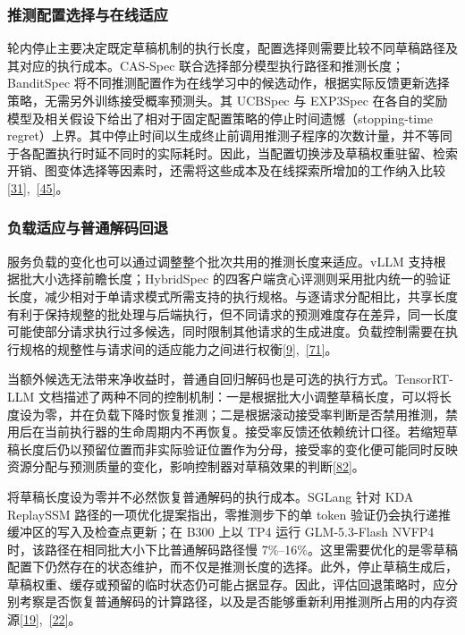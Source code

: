 \documentclass[11pt,a4paper,UTF8,fontset=none,scheme=plain,zihao=-4]{ctexart}
\begin{document}
\hypertarget{section-6-1-2}{%
\subsubsection{推测配置选择与在线适应}\label{section-6-1-2}}

轮内停止主要决定既定草稿机制的执行长度，配置选择则需要比较不同草稿路径及其对应的执行成本。CAS-Spec
联合选择部分模型执行路径和推测长度；BanditSpec
将不同推测配置作为在线学习中的候选动作，根据实际反馈更新选择策略，无需另外训练接受概率预测头。其
UCBSpec 与 EXP3Spec
在各自的奖励模型及相关假设下给出了相对于固定配置策略的停止时间遗憾（stopping-time
regret）上界。其中停止时间以生成终止前调用推测子程序的次数计量，并不等同于各配置执行时延不同时的实际耗时。因此，当配置切换涉及草稿权重驻留、检索开销、图变体选择等因素时，还需将这些成本及在线探索所增加的工作纳入比较\protect\hyperlink{ref-casspec}{{[}31{]}},~\protect\hyperlink{ref-banditspec}{{[}45{]}}。

\hypertarget{section-6-1-3}{%
\subsubsection{负载适应与普通解码回退}\label{section-6-1-3}}

服务负载的变化也可以通过调整整个批次共用的推测长度来适应。vLLM
支持根据批大小选择前瞻长度；HybridSpec
的四客户端贪心评测则采用批内统一的验证长度，减少相对于单请求模式所需支持的执行规格。与逐请求分配相比，共享长度有利于保持规整的批处理与后端执行，但不同请求的预测难度存在差异，同一长度可能使部分请求执行过多候选，同时限制其他请求的生成进度。负载控制需要在执行规格的规整性与请求间的适应能力之间进行权衡\protect\hyperlink{ref-hybridspec}{{[}9{]}},~\protect\hyperlink{ref-vllmconfigdocs}{{[}71{]}}。

当额外候选无法带来净收益时，普通自回归解码也是可选的执行方式。TensorRT-LLM
文档描述了两种不同的控制机制：一是根据批大小调整草稿长度，可以将长度设为零，并在负载下降时恢复推测；二是根据滚动接受率判断是否禁用推测，禁用后在当前执行器的生命周期内不再恢复。接受率反馈还依赖统计口径。若缩短草稿长度后仍以预留位置而非实际验证位置作为分母，接受率的变化便可能同时反映资源分配与预测质量的变化，影响控制器对草稿效果的判断\protect\hyperlink{ref-trtllmspec}{{[}82{]}}。

将草稿长度设为零并不必然恢复普通解码的执行成本。SGLang 针对 KDA
ReplaySSM 路径的一项优化提案指出，零推测步下的单 token
验证仍会执行递推缓冲区的写入及检查点更新；在 B300 上以 TP4 运行
GLM-5.3-Flash NVFP4 时，该路径在相同批大小下比普通解码路径慢
7\%--16\%。这里需要优化的是零草稿配置下仍然存在的状态维护，而不仅是推测长度的选择。此外，停止草稿生成后，草稿权重、缓存或预留的临时状态仍可能占据显存。因此，评估回退策略时，应分别考察是否恢复普通解码的计算路径，以及是否能够重新利用推测所占用的内存资源\protect\hyperlink{ref-sglstepzero}{{[}19{]}},~\protect\hyperlink{ref-windowedmtp}{{[}22{]}}。
\end{document}
